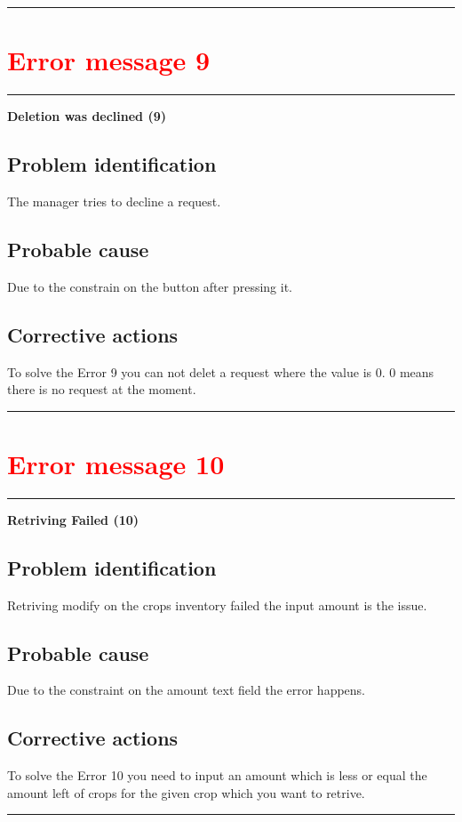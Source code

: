 \vspace{0.5cm}
\hrule


\section{{\textbf{\textcolor{red}{Error message 9}}}} 
\hrule
\vspace{0.5cm}
\textbf{Deletion was declined (9)}

\subsection{Problem identification}
The manager tries to decline a request.

\subsection{Probable cause}
Due to the constrain on the button after pressing it.

\subsection{Corrective actions}
To solve the Error 9 you can not delet a request where the value is 0. 0 means
there is no request at the moment.

\vspace{0.5cm}
\hrule
\break

\section{{\textbf{\textcolor{red}{Error message 10}}}}
\hrule
\vspace{0.5cm}
\textbf{Retriving Failed (10)}

\subsection{Problem identification}
Retriving modify on the crops inventory failed the input amount is the issue.

\subsection{Probable cause}
Due to the constraint on the amount text field the error happens.

\subsection{Corrective actions}
To solve the Error 10 you need to input an amount which is less or equal the
amount left of crops for the given crop which you want to retrive.

\vspace{0.5cm}
\hrule






